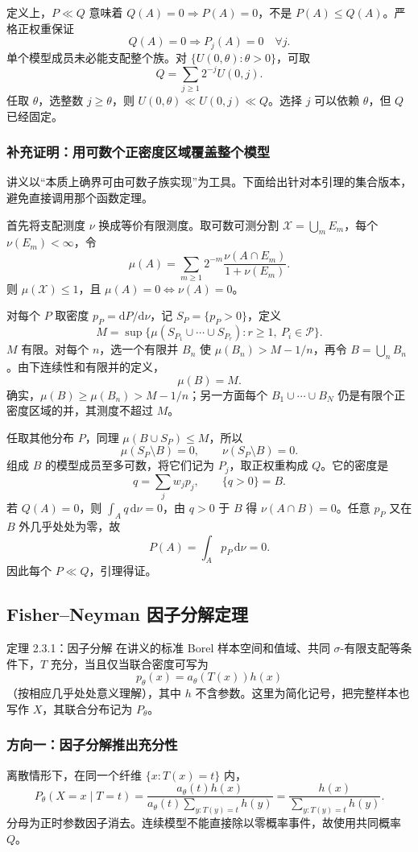 定义上，$P\ll Q$ 意味着 $Q(A)=0\Rightarrow P(A)=0$，不是 $P(A)\le Q(A)$。严格正权重保证
\[
 Q(A)=0\Rightarrow P_j(A)=0\quad\forall j.
\]
单个模型成员未必能支配整个族。对 $\{U(0,\theta):\theta>0\}$，可取
\[
 Q=\sum_{j\ge1}2^{-j}U(0,j).
\]
任取 $\theta$，选整数 $j\ge\theta$，则 $U(0,\theta)\ll U(0,j)\ll Q$。选择 $j$ 可以依赖 $\theta$，但 $Q$ 已经固定。

\subsubsection{补充证明：用可数个正密度区域覆盖整个模型}
讲义以“本质上确界可由可数子族实现”为工具。下面给出针对本引理的集合版本，避免直接调用那个函数定理。

首先将支配测度 $\nu$ 换成等价有限测度。取可数可测分割 $\mathcal X=\bigcup_mE_m$，每个 $\nu(E_m)<\infty$，令
\[
 \mu(A)=\sum_{m\ge1}2^{-m}\frac{\nu(A\cap E_m)}{1+\nu(E_m)}.
\]
则 $\mu(\mathcal X)\le1$，且 $\mu(A)=0\iff\nu(A)=0$。

对每个 $P$ 取密度 $p_P=\mathrm dP/\mathrm d\nu$，记 $S_P=\{p_P>0\}$，定义
\[
 M=\sup\{\mu(S_{P_1}\cup\cdots\cup S_{P_r}):r\ge1,\ P_i\in\mathcal P\}.
\]
$M$ 有限。对每个 $n$，选一个有限并 $B_n$ 使 $\mu(B_n)>M-1/n$，再令 $B=\bigcup_nB_n$。由下连续性和有限并的定义，
\[
 \mu(B)=M.
\]
确实，$\mu(B)\ge\mu(B_n)>M-1/n$；另一方面每个 $B_1\cup\cdots\cup B_N$ 仍是有限个正密度区域的并，其测度不超过 $M$。

任取其他分布 $P$，同理 $\mu(B\cup S_P)\le M$，所以
\[
 \mu(S_P\setminus B)=0,\qquad \nu(S_P\setminus B)=0.
\]
组成 $B$ 的模型成员至多可数，将它们记为 $P_j$，取正权重构成 $Q$。它的密度是
\[
 q=\sum_jw_jp_j,\qquad\{q>0\}=B.
\]
若 $Q(A)=0$，则 $\int_Aq\,\mathrm d\nu=0$，由 $q>0$ 于 $B$ 得 $\nu(A\cap B)=0$。任意 $p_P$ 又在 $B$ 外几乎处处为零，故
\[
 P(A)=\int_Ap_P\,\mathrm d\nu=0.
\]
因此每个 $P\ll Q$，引理得证。

\subsection{Fisher--Neyman 因子分解定理}
\begin{definitionbox}{定理 2.3.1：因子分解}
在讲义的标准 Borel 样本空间和值域、共同 $\sigma$-有限支配等条件下，$T$ 充分，当且仅当联合密度可写为
\[
 p_\theta(x)=a_\theta(T(x))h(x)
\]
（按相应几乎处处意义理解），其中 $h$ 不含参数。这里为简化记号，把完整样本也写作 $X$，其联合分布记为 $P_\theta$。
\end{definitionbox}

\subsubsection{方向一：因子分解推出充分性}
离散情形下，在同一个纤维 $\{x:T(x)=t\}$ 内，
\[
 P_\theta(X=x\mid T=t)
 =\frac{a_\theta(t)h(x)}
 {a_\theta(t)\sum_{y:T(y)=t}h(y)}
 =\frac{h(x)}{\sum_{y:T(y)=t}h(y)}.
\]
分母为正时参数因子消去。连续模型不能直接除以零概率事件，故使用共同概率 $Q$。

